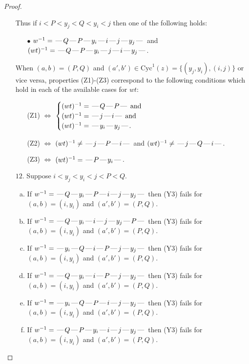 \documentclass[10pt]{article}
\theoremstyle{definition}
\theoremstyle{definition}
\def\dash{\text{\hspace{0.5mm}---\hspace{0.5mm}}}
\def\Cyc{\mathrm{Cyc}}
\begin{document}
\begin{proof}
\begin{enumerate}
\begin{enumerate}[(a)]
\end{enumerate}
Thus if $i < P < y_j < Q < y_i < j$ then one of the following holds:
\begin{enumerate}
\item[$\bullet$] $w^{-1} = \dash Q\dash P\dash y_i\dash i\dash j\dash y_j\dash $ and $(wt)^{-1} = \dash Q\dash P\dash y_i\dash j\dash i\dash y_j\dash $.
\end{enumerate}
When $(a,b)= (P,Q)$ and $(a',b')\in \Cyc^1(z)=\{(y_j,y_i),(i,j)\}$ or vice versa,
properties (Z1)-(Z3) correspond to the following conditions which
hold in each of the available cases for $wt$:
\begin{enumerate}
\item[](Z1) $\Leftrightarrow$ $\begin{cases}\text{$(wt)^{-1} = \dash Q \dash P \dash$}\text{ and }\\
\text{$(wt)^{-1} = \dash j \dash i \dash$}\text{ and }\\
\text{$(wt)^{-1} = \dash y_i \dash y_j \dash$}.\end{cases}$
\item[](Z2) $\Leftrightarrow$ $(wt)^{-1} \neq \dash j \dash P \dash i \dash$ and $(wt)^{-1}\neq \dash j \dash Q \dash i \dash$.
\item[](Z3) $\Leftrightarrow$ $(wt)^{-1} = \dash P \dash y_i \dash$.
\end{enumerate}
\item[$12$.] Suppose $i < y_j < y_i < j < P < Q$.
\begin{enumerate}[(a)]
\item If $w^{-1} = \dash Q\dash y_i\dash P\dash i\dash j\dash y_j\dash $ then (Y3) fails for $(a,b)=(i,y_i)$ and $(a',b')=(P,Q)$.
\item If $w^{-1} = \dash Q\dash y_i\dash i\dash j\dash y_j\dash P\dash $ then (Y3) fails for $(a,b)=(i,y_i)$ and $(a',b')=(P,Q)$.
\item If $w^{-1} = \dash y_i\dash Q\dash i\dash P\dash j\dash y_j\dash $ then (Y3) fails for $(a,b)=(i,y_i)$ and $(a',b')=(P,Q)$.
\item If $w^{-1} = \dash Q\dash y_i\dash i\dash P\dash j\dash y_j\dash $ then (Y3) fails for $(a,b)=(i,y_i)$ and $(a',b')=(P,Q)$.
\item If $w^{-1} = \dash y_i\dash Q\dash P\dash i\dash j\dash y_j\dash $ then (Y3) fails for $(a,b)=(i,y_i)$ and $(a',b')=(P,Q)$.
\item If $w^{-1} = \dash Q\dash P\dash y_i\dash i\dash j\dash y_j\dash $ then (Y3) fails for $(a,b)=(i,y_i)$ and $(a',b')=(P,Q)$.

\end{enumerate}
\end{enumerate}
\end{proof}
\end{document}

